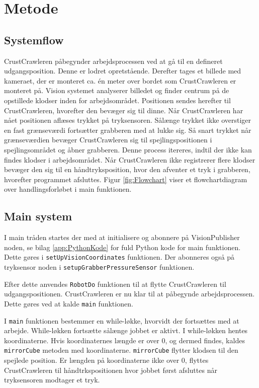 \chapter{Metode}\label{chap:Metode}
\section{Systemflow}
CrustCrawleren påbegynder arbejdsprocessen ved at gå til en defineret udgangsposition. Denne er lodret opretstående.
Derefter tages et billede med kameraet, der er monteret ca. én meter over bordet som CrustCrawleren er monteret på.
Vision systemet analyserer billedet og finder centrum på de opstillede klodser inden for arbejdsområdet.
Positionen sendes herefter til CrustCrawleren, hvorefter den bevæger sig til dinne.
Når CrustCrawleren har nået positionen aflæses trykket på tryksensoren.
Sålænge trykket ikke overstiger en fast grænseværdi fortsætter grabberen med at lukke sig.
Så snart trykket når grænseværdien bevæger CrustCrawleren sig til spejlingspositionen i spejlingsområdet og åbner grabberen.
Denne process itereres, indtil der ikke kan findes klodser i arbejdsområdet.
Når CrustCrawleren ikke registrerer flere klodser bevæger den sig til en håndtryksposition, hvor den afventer et tryk i grabberen, hvorefter programmet afsluttes.
Figur \vref{fig:Flowchart} viser et flowchartdiagram over handlingsforløbet i main funktionen.
 
\section{Main system}
I main tråden startes der med at initialisere og abonnere på VisionPublisher noden, se bilag \vref{app:PythonKode} for fuld Python kode for main funktionen.
Dette gøres i \texttt{setUpVisionCoordinates} funktionen.
Der abonneres også på tryksensor noden i \texttt{setupGrabberPressureSensor} funktionen.

Efter dette anvendes \texttt{RobotDo} funktionen til at flytte CrustCrawleren til udgangspositionen.
CrustCrawleren er nu klar til at påbegynde arbejdsprocessen.
Dette gøres ved at kalde \texttt{main} funktionen.

I \texttt{main} funktionen bestemmer en while-løkke, hvorvidt der fortsættes med at arbejde.
While-løkken fortsætte sålænge jobbet er aktivt.
I while-løkken hentes koordinaterne.
Hvis koordinaternes længde er over 0, og dermed findes, kaldes \texttt{mirrorCube} metoden med koordinaterne.
\texttt{mirrorCube} flytter klodsen til den spejlede position.
Er længden på koordinaterne ikke over 0, flyttes CrustCrawleren til håndtrkspositionen hvor jobbet først afsluttes når tryksensoren modtager et tryk.

